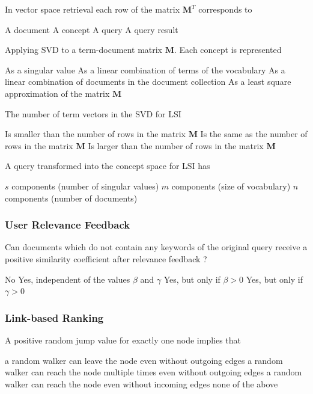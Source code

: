 \documentclass[12pt,a4paper,answers]{exam} %
\newcommand{\mat}[1]{\ensuremath{\textbf{#1}}}
\begin{document}
\begin{flushleft}
\begin{multicols*}{2}
\begin{questions}
\question In vector space retrieval each row of the matrix $\mat{M}^T$ corresponds to
\begin{checkboxes}
\CorrectChoice A document
\choice A concept
\choice A query
\choice A query result
\end{checkboxes}

\question Applying SVD to a term-document matrix \mat{M}. Each concept is represented
\begin{checkboxes}
\choice As a singular value
\CorrectChoice As a linear combination of terms of the vocabulary
\choice As a linear combination of documents in the document collection
\choice As a least square approximation of the matrix \mat{M}
\end{checkboxes}

\question The number of term vectors in the SVD for LSI
\begin{checkboxes}
\choice Is smaller than the number of rows in the matrix \mat{M}
\CorrectChoice Is the same as the number of rows in the matrix \mat{M}
\choice Is larger than the number of rows in the matrix \mat{M}
\end{checkboxes}

\question A query transformed into the concept space for LSI has
\begin{checkboxes}
\CorrectChoice $s$ components (number of singular values)
\choice $m$ components (size of vocabulary)
\choice $n$ components (number of documents)
\end{checkboxes}


\subsubsection{User Relevance Feedback}

\question Can documents which do not contain any keywords of the original query receive a positive similarity coefficient after relevance feedback ?
\begin{checkboxes}
\choice No
\choice Yes, independent of the values $\beta$ and $\gamma$
\CorrectChoice Yes, but only if $\beta>0$
\choice Yes, but only if $\gamma>0$
\end{checkboxes}


\subsubsection{Link-based Ranking}

\question A positive random jump value for exactly one node implies that
\begin{checkboxes}
\CorrectChoice a random walker can leave the node even without outgoing edges
\choice a random walker can reach the node multiple times even without outgoing edges
\CorrectChoice a random walker can reach the node even without incoming edges
\choice none of the above
\end{checkboxes}


\end{questions}
\end{multicols*}
\end{flushleft}
\end{document}
